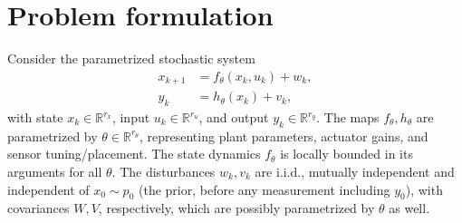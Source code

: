 \documentclass[twocolumn,amsthm]{autart}
\begin{document}
\section{Problem formulation}\label{sec:formulation}

Consider the parametrized stochastic system
\begin{subequations}\label{eq:ss}
\begin{align}
x_{k+1} &= f_\theta(x_k, u_k) + w_k, \label{eq:ss-state}\\
y_k     &= h_\theta(x_k) + v_k, \label{eq:ss-output}
\end{align}
\end{subequations}
with state $x_k \in \mathbb{R}^{r_x}$, input $u_k \in \mathbb{R}^{r_u}$, and
output $y_k \in \mathbb{R}^{r_y}$. The maps $f_\theta, h_\theta$ are parametrized by $\theta \in \mathbb{R}^{r_\theta}$, representing plant parameters, actuator gains, and sensor tuning/placement. The state dynamics $f_\theta$ is locally bounded in its arguments for all $\theta$. The disturbances $w_k, v_k$ are i.i.d.,
mutually independent and independent of $x_0 \sim p_0$ (the prior, before any
measurement including $y_0$), with covariances $W,V$, respectively, which are possibly parametrized by $\theta$ as well.
\end{document}
